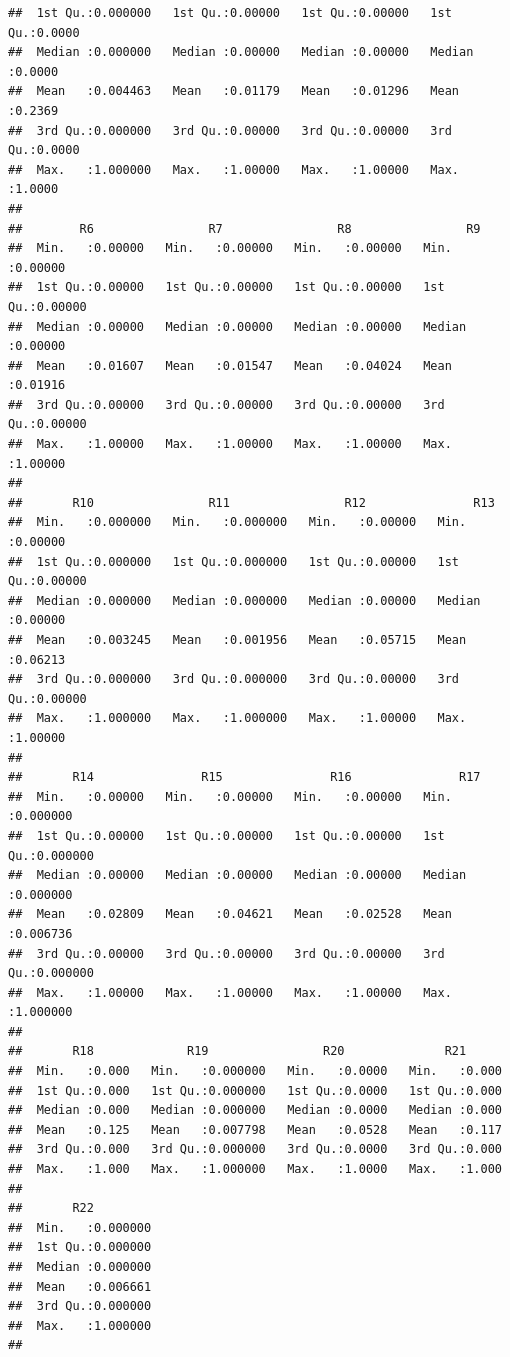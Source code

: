 \documentclass[
]{article}
\begin{document}
\begin{verbatim}
##  1st Qu.:0.000000   1st Qu.:0.00000   1st Qu.:0.00000   1st Qu.:0.0000  
##  Median :0.000000   Median :0.00000   Median :0.00000   Median :0.0000  
##  Mean   :0.004463   Mean   :0.01179   Mean   :0.01296   Mean   :0.2369  
##  3rd Qu.:0.000000   3rd Qu.:0.00000   3rd Qu.:0.00000   3rd Qu.:0.0000  
##  Max.   :1.000000   Max.   :1.00000   Max.   :1.00000   Max.   :1.0000  
##                                                                         
##        R6                R7                R8                R9         
##  Min.   :0.00000   Min.   :0.00000   Min.   :0.00000   Min.   :0.00000  
##  1st Qu.:0.00000   1st Qu.:0.00000   1st Qu.:0.00000   1st Qu.:0.00000  
##  Median :0.00000   Median :0.00000   Median :0.00000   Median :0.00000  
##  Mean   :0.01607   Mean   :0.01547   Mean   :0.04024   Mean   :0.01916  
##  3rd Qu.:0.00000   3rd Qu.:0.00000   3rd Qu.:0.00000   3rd Qu.:0.00000  
##  Max.   :1.00000   Max.   :1.00000   Max.   :1.00000   Max.   :1.00000  
##                                                                         
##       R10                R11                R12               R13         
##  Min.   :0.000000   Min.   :0.000000   Min.   :0.00000   Min.   :0.00000  
##  1st Qu.:0.000000   1st Qu.:0.000000   1st Qu.:0.00000   1st Qu.:0.00000  
##  Median :0.000000   Median :0.000000   Median :0.00000   Median :0.00000  
##  Mean   :0.003245   Mean   :0.001956   Mean   :0.05715   Mean   :0.06213  
##  3rd Qu.:0.000000   3rd Qu.:0.000000   3rd Qu.:0.00000   3rd Qu.:0.00000  
##  Max.   :1.000000   Max.   :1.000000   Max.   :1.00000   Max.   :1.00000  
##                                                                           
##       R14               R15               R16               R17          
##  Min.   :0.00000   Min.   :0.00000   Min.   :0.00000   Min.   :0.000000  
##  1st Qu.:0.00000   1st Qu.:0.00000   1st Qu.:0.00000   1st Qu.:0.000000  
##  Median :0.00000   Median :0.00000   Median :0.00000   Median :0.000000  
##  Mean   :0.02809   Mean   :0.04621   Mean   :0.02528   Mean   :0.006736  
##  3rd Qu.:0.00000   3rd Qu.:0.00000   3rd Qu.:0.00000   3rd Qu.:0.000000  
##  Max.   :1.00000   Max.   :1.00000   Max.   :1.00000   Max.   :1.000000  
##                                                                          
##       R18             R19                R20              R21       
##  Min.   :0.000   Min.   :0.000000   Min.   :0.0000   Min.   :0.000  
##  1st Qu.:0.000   1st Qu.:0.000000   1st Qu.:0.0000   1st Qu.:0.000  
##  Median :0.000   Median :0.000000   Median :0.0000   Median :0.000  
##  Mean   :0.125   Mean   :0.007798   Mean   :0.0528   Mean   :0.117  
##  3rd Qu.:0.000   3rd Qu.:0.000000   3rd Qu.:0.0000   3rd Qu.:0.000  
##  Max.   :1.000   Max.   :1.000000   Max.   :1.0000   Max.   :1.000  
##                                                                     
##       R22          
##  Min.   :0.000000  
##  1st Qu.:0.000000  
##  Median :0.000000  
##  Mean   :0.006661  
##  3rd Qu.:0.000000  
##  Max.   :1.000000  
## 
\end{verbatim}
\end{document}
